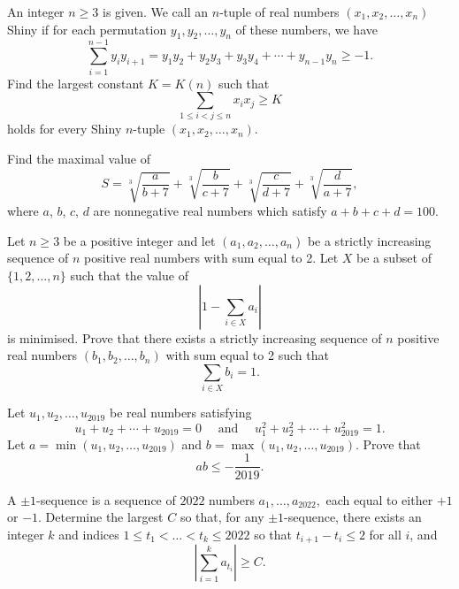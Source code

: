 \documentclass[11pt]{scrartcl}
\begin{document}
\begin{Problem}
An integer $n \geq 3$ is given. We call an $n$-tuple of real numbers $(x_1, x_2, \dots, x_n)$ Shiny if for each permutation $y_1, y_2, \dots, y_n$ of these numbers, we have
$$\sum \limits_{i=1}^{n-1} y_i y_{i+1} = y_1y_2 + y_2y_3 + y_3y_4 + \cdots + y_{n-1}y_n \geq -1.$$Find the largest constant $K = K(n)$ such that
$$\sum \limits_{1 \leq i < j \leq n} x_i x_j \geq K$$holds for every Shiny $n$-tuple $(x_1, x_2, \dots, x_n)$.
\end{Problem}




\begin{Problem}
Find the maximal value of
\[S = \sqrt[3]{\frac{a}{b+7}} + \sqrt[3]{\frac{b}{c+7}} + \sqrt[3]{\frac{c}{d+7}} + \sqrt[3]{\frac{d}{a+7}},\]where $a$, $b$, $c$, $d$ are nonnegative real numbers which satisfy $a+b+c+d = 100$.
\end{Problem}


\begin{Problem}
Let $n \geqslant 3$ be a positive integer and let $\left(a_{1}, a_{2}, \ldots, a_{n}\right)$ be a strictly increasing sequence of $n$ positive real numbers with sum equal to 2. Let $X$ be a subset of $\{1,2, \ldots, n\}$ such that the value of
\[
\left|1-\sum_{i \in X} a_{i}\right|
\]is minimised. Prove that there exists a strictly increasing sequence of $n$ positive real numbers $\left(b_{1}, b_{2}, \ldots, b_{n}\right)$ with sum equal to 2 such that
\[
\sum_{i \in X} b_{i}=1.
\]
\end{Problem}


\begin{Problem}
Let $u_1, u_2, \dots, u_{2019}$ be real numbers satisfying\[u_{1}+u_{2}+\cdots+u_{2019}=0 \quad \text { and } \quad u_{1}^{2}+u_{2}^{2}+\cdots+u_{2019}^{2}=1.\]Let $a=\min \left(u_{1}, u_{2}, \ldots, u_{2019}\right)$ and $b=\max \left(u_{1}, u_{2}, \ldots, u_{2019}\right)$. Prove that
\[
a b \leqslant-\frac{1}{2019}.
\]
\end{Problem}


\begin{Problem}
A $\pm 1$-sequence is a sequence of $2022$ numbers $a_1, \ldots, a_{2022},$ each equal to either $+1$ or $-1$. Determine the largest $C$ so that, for any $\pm 1$-sequence, there exists an integer $k$ and indices $1 \le t_1 < \ldots < t_k \le 2022$ so that $t_{i+1} - t_i \le 2$ for all $i$, and$$\left| \sum_{i = 1}^{k} a_{t_i} \right| \ge C.$$
\end{Problem}
\end{document}
